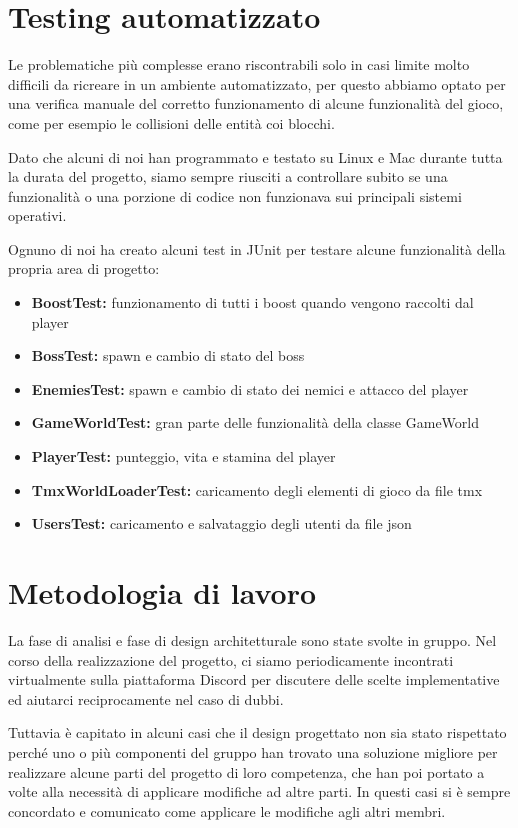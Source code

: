 \documentclass[a4paper,12pt]{report}
\begin{document}
\section{Testing automatizzato}

Le problematiche più complesse erano riscontrabili solo in casi limite molto difficili da ricreare in un ambiente automatizzato, per questo abbiamo optato per una verifica manuale del corretto funzionamento di alcune funzionalità del gioco, come per esempio le collisioni delle entità coi blocchi.

Dato che alcuni di noi han programmato e testato su Linux e Mac durante tutta la durata del progetto, siamo sempre riusciti a controllare subito se una funzionalità o una porzione di codice non funzionava sui principali sistemi operativi.

Ognuno di noi ha creato alcuni test in JUnit per testare alcune funzionalità della propria area di progetto:
\begin{itemize}
    \item \textbf{BoostTest:} funzionamento di tutti i boost quando vengono raccolti dal player
    \item \textbf{BossTest:} spawn e cambio di stato del boss
    \item \textbf{EnemiesTest:} spawn e cambio di stato dei nemici e attacco del player
    \item \textbf{GameWorldTest:} gran parte delle funzionalità della classe GameWorld
    \item \textbf{PlayerTest:} punteggio, vita e stamina del player
    \item \textbf{TmxWorldLoaderTest:} caricamento degli elementi di gioco da file tmx
    \item \textbf{UsersTest:} caricamento e salvataggio degli utenti da file json
\end{itemize}

\section{Metodologia di lavoro}

La fase di analisi e fase di design architetturale sono state svolte in gruppo. Nel corso della realizzazione del progetto, ci siamo periodicamente incontrati virtualmente sulla piattaforma Discord per discutere delle scelte implementative ed aiutarci reciprocamente nel caso di dubbi. 

Tuttavia è capitato in alcuni casi che il design progettato non sia stato rispettato perché uno o più componenti del gruppo han trovato una soluzione migliore per realizzare alcune parti del progetto di loro competenza, che han poi portato a volte alla necessità di applicare modifiche ad altre parti. In questi casi si è sempre concordato e comunicato come applicare le modifiche agli altri membri.
\end{document}
